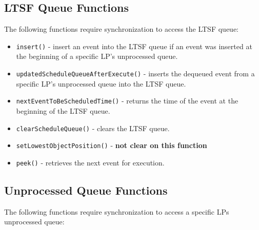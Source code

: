 \documentclass[11pt]{book}
\begin{document}
\subsection{LTSF Queue Functions}

The following functions require synchronization to access the LTSF
queue:

\begin{itemize}
  \item\texttt{insert()} - insert an event into the LTSF queue if an event was inserted at
    the beginning of a specific LP's unprocessed queue.
  \item\texttt{updatedScheduleQueueAfterExecute()} - inserts the dequeued event from a
    specific LP's unprocessed queue into the LTSF queue.
  \item\texttt{nextEventToBeScheduledTime()} - returns the time of the event at the
    beginning of the LTSF queue.
  \item\texttt{clearScheduleQueue()} - clears the LTSF queue.
  \item\texttt{setLowestObjectPosition()} - \textbf{not clear on this function}
  \item\texttt{peek()} - retrieves the next event for execution.
\end{itemize}

\subsection{Unprocessed Queue Functions}

The following functions require synchronization to access a specific LPs
unprocessed queue:
\end{document}
